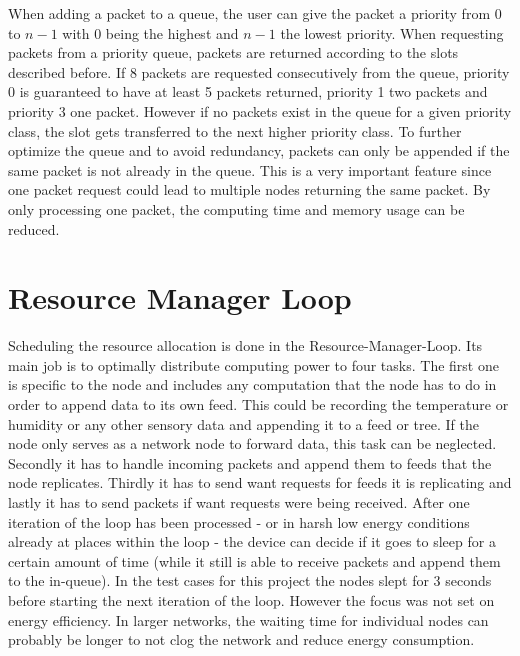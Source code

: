 When adding a packet to a queue, the user can give the packet a priority from 0 to $n - 1$ with 0 being the highest and $n-1$ the lowest priority. When requesting packets from a priority queue, packets are returned according to the slots described before. If 8 packets are requested consecutively from the queue, priority 0 is guaranteed to have at least 5 packets returned, priority 1 two packets and priority 3 one packet. However if no packets exist in the queue for a given priority class, the slot gets transferred to the next higher priority class. To further optimize the queue and to avoid redundancy, packets can only be appended if the same packet is not already in the queue. This is a very important feature since one packet request could lead to multiple nodes returning the same packet. By only processing one packet, the computing time and memory usage can be reduced.

\section{Resource Manager Loop}
Scheduling the resource allocation is done in the Resource-Manager-Loop. Its main job is to optimally distribute computing power to four tasks. The first one is specific to the node and includes any computation that the node has to do in order to append data to its own feed. This could be recording the temperature or humidity or any other sensory data and appending it to a feed or tree. If the node only serves as a network node to forward data, this task can be neglected. Secondly it has to handle incoming packets and append them to feeds that the node replicates. Thirdly it has to send want requests for feeds it is replicating and lastly it has to send packets if want requests were being received. After one iteration of the loop has been processed - or in harsh low energy conditions already at places within the loop - the device can decide if it goes to sleep for a certain amount of time (while it still is able to receive packets and append them to the in-queue). In the test cases for this project the nodes slept for 3 seconds before starting the next iteration of the loop. However the focus was not set on energy efficiency. In larger networks, the waiting time for individual nodes can probably be longer to not clog the network and reduce energy consumption.

